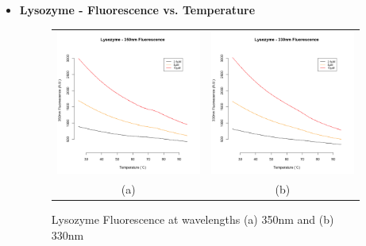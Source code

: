 \documentclass[a4paper,11pt]{article}
\begin{document}
            \begin{itemize}
                \item {\bfseries Lysozyme - Fluorescence vs. Temperature}
                \begin{figure}[H]
                    \centering
                    \begin{tabular}{cc}
                        \includegraphics[width=180px]{../resources/unfolding_lys_350.png} &
                        \includegraphics[width=180px]{../resources/unfolding_lys_330.png} \\
                        (a) & (b)\\
                    \end{tabular}
                    \caption{Lysozyme Fluorescence at wavelengths (a) 350nm and (b) 330nm}\label{fig:lys_flr}
                \end{figure}
                

\end{itemize}
\end{document}
